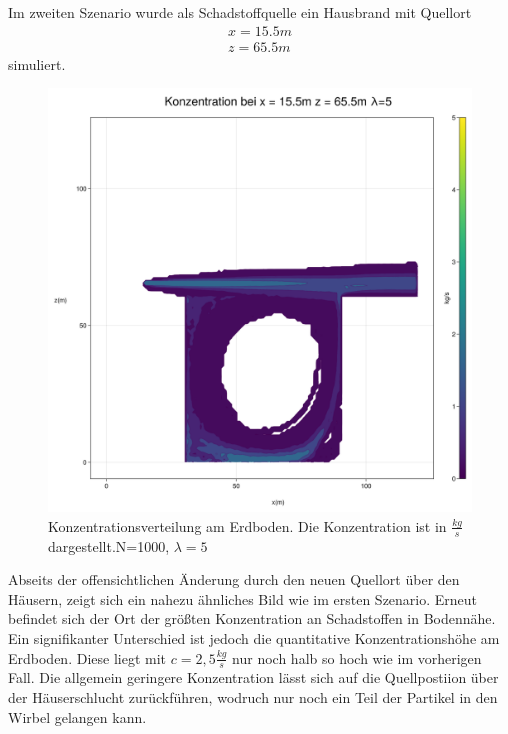 \documentclass[ngerman]{scrartcl}
\begin{document}
Im zweiten Szenario wurde als  Schadstoffquelle ein Hausbrand mit Quellort
\begin{align}
	x=15.5 \si{m} \\
	z= 65.5 \si{m} 
\end{align}
simuliert.
\begin{figure}[H]
	\centering
	\includegraphics[scale=0.3]{Bilder/3_single_x = 15.5.png}
	\caption{Konzentrationsverteilung am Erdboden. Die Konzentration ist in $\frac{\si{kg}}{\si{s}}$ dargestellt.N=1000, $\lambda =5$}
	\label{fig:my_label}
\end{figure}
Abseits der offensichtlichen Änderung durch den neuen Quellort über den Häusern, zeigt sich ein nahezu ähnliches Bild wie im ersten Szenario. Erneut befindet sich der Ort der größten Konzentration an Schadstoffen in Bodennähe. Ein signifikanter Unterschied ist jedoch die quantitative  Konzentrationshöhe am Erdboden. Diese liegt mit $c= 2,5 \frac{\si{kg}}{\si{s}}$ nur noch halb so hoch wie im vorherigen Fall. Die allgemein geringere Konzentration lässt sich auf die Quellpostiion über der Häuserschlucht zurückführen, wodruch nur noch ein Teil der Partikel in den Wirbel gelangen kann.
\end{document}
